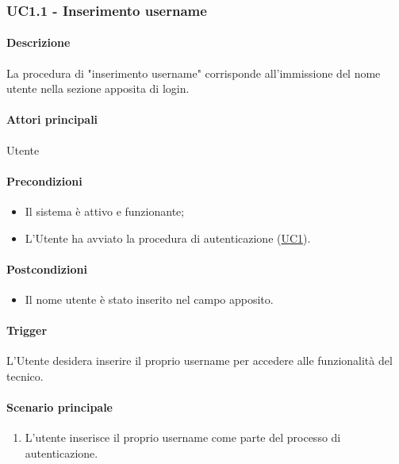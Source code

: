
\subsubsection{UC1.1 - Inserimento username}\label{UC1point1}

\paragraph*{Descrizione}
La procedura di "inserimento username" corrisponde all'immissione del nome utente nella sezione apposita di login.

\paragraph*{Attori principali}
Utente

\paragraph*{Precondizioni}
\begin{itemize}
  \item Il sistema è attivo e funzionante;
  \item L'Utente ha avviato la procedura di autenticazione (\hyperref[UC1]{UC1}).  
\end{itemize}

\paragraph*{Postcondizioni}
\begin{itemize}
  \item Il nome utente è stato inserito nel campo apposito.
\end{itemize}

\paragraph*{Trigger}
L'Utente desidera inserire il proprio username per accedere alle funzionalità del tecnico.

\paragraph*{Scenario principale}
\begin{enumerate}
  \item L'utente inserisce il proprio username come parte del processo di autenticazione.
\end{enumerate}

